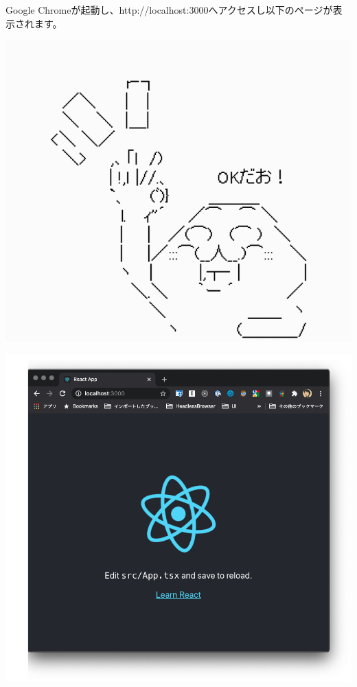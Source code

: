 Google Chromeが起動し、http://localhost:3000へアクセスし以下のページが表示されます。

\begin{reviewimage}[H]%
\includegraphics[width=0.5\maxwidth]{./images/02-create-react-app/ok.png}%
\label{image:02-create-react-app:ok}
\end{reviewimage}
\begin{reviewimage}[H]%
\includegraphics[width=0.9\maxwidth]{./images/02-create-react-app/02_cra_start.png}%
\label{image:02-create-react-app:02_cra_start}
\end{reviewimage}


